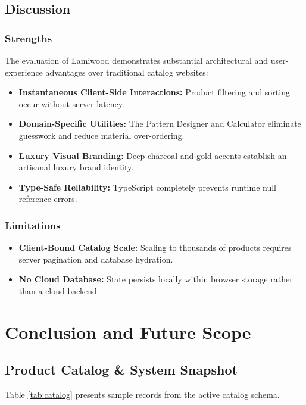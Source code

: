 \documentclass[12pt,a4paper]{report}
\begin{document}
\section{Discussion}
\subsection{Strengths}
The evaluation of Lamiwood demonstrates substantial architectural and user-experience advantages over traditional catalog websites:
\begin{itemize}
    \item \textbf{Instantaneous Client-Side Interactions:} Product filtering and sorting occur without server latency.
    \item \textbf{Domain-Specific Utilities:} The Pattern Designer and Calculator eliminate guesswork and reduce material over-ordering.
    \item \textbf{Luxury Visual Branding:} Deep charcoal and gold accents establish an artisanal luxury brand identity.
    \item \textbf{Type-Safe Reliability:} TypeScript completely prevents runtime null reference errors.
\end{itemize}

\subsection{Limitations}
\begin{itemize}
    \item \textbf{Client-Bound Catalog Scale:} Scaling to thousands of products requires server pagination and database hydration.
    \item \textbf{No Cloud Database:} State persists locally within browser storage rather than a cloud backend.
\end{itemize}

\chapter{Conclusion and Future Scope}

\section{Product Catalog \& System Snapshot}
Table \ref{tab:catalog} presents sample records from the active catalog schema.
\end{document}
